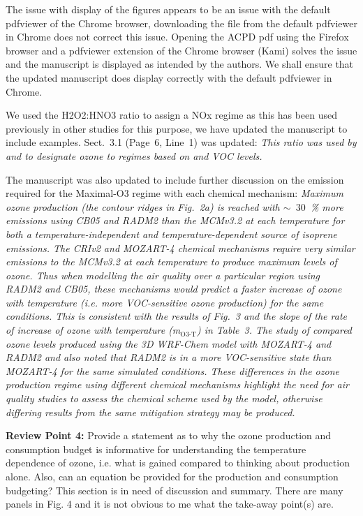 \documentclass{article}
\begin{document}
The issue with display of the figures appears to be an issue with the default pdfviewer of the Chrome browser, downloading the file from the default pdfviewer in Chrome does not correct this issue. Opening the ACPD pdf using the Firefox browser and a pdfviewer extension of the Chrome browser (Kami) solves the issue and the manuscript is displayed as intended by the authors. We shall ensure that the updated manuscript does display correctly with the default pdfviewer in Chrome.

We used the H2O2:HNO3 ratio to assign a NOx regime as this has been used previously in other studies for this purpose, we have updated the manuscript to include examples. Sect.~3.1 (Page~6, Line~1) was updated:
\textit{
This ratio was used by \citet{Sillman:1995} and \citet{Staffelbach:1997} to designate ozone to  regimes based on  and VOC levels. 
}

The manuscript was also updated to include further discussion on the  emission required for the Maximal-O3 regime with each chemical mechanism:
\textit{
Maximum ozone production (the contour ridges in Fig.~2a) is reached with $\sim$~$30$~\% more  emissions using CB05 and RADM2 than the MCMv3.2 at each temperature for both a temperature-independent and temperature-dependent source of isoprene emissions.
The CRIv2 and MOZART-4 chemical mechanisms require very similar  emissions to the MCMv3.2 at each temperature to produce maximum levels of ozone.
Thus when modelling the air quality over a particular region using RADM2 and CB05, these mechanisms would predict a faster increase of ozone with temperature (i.e. more VOC-sensitive ozone production) for the same conditions.
This is consistent with the results of Fig.~3 and the slope of the rate of increase of ozone with temperature (m$_{\text{O3-T}}$) in Table~3.
The study of \citet{Mar:2016} compared ozone levels produced using the 3D WRF-Chem model with MOZART-4 and RADM2 and also noted that RADM2 is in a more VOC-sensitive state than MOZART-4 for the same simulated conditions.
These differences in the ozone production regime using different chemical mechanisms highlight the need for air quality studies to assess the chemical scheme used by the model, otherwise differing results from the same mitigation strategy may be produced.
}

\textbf{Review Point 4:}  Provide a statement as to why the ozone production and consumption budget is informative for understanding the temperature dependence of ozone, i.e.  what is gained compared to thinking about production alone. Also, can an equation be provided for the production and consumption budgeting? This section is in need of discussion and summary. There are many panels in Fig. 4 and it is not obvious to me what the take-away point(s) are.
\end{document}
